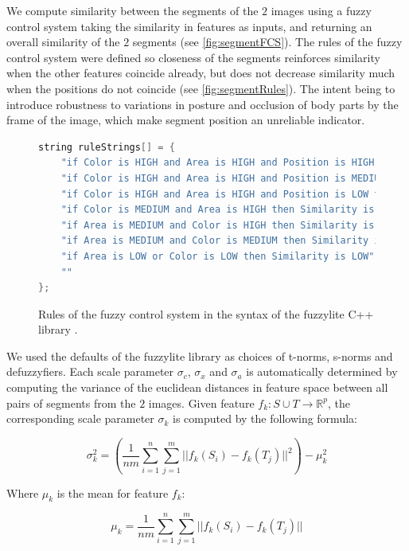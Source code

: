 We compute similarity between the segments of the $2$ images using a fuzzy control system taking the similarity in features as inputs, and returning an overall similarity of the $2$ segments (see \autoref{fig:segmentFCS}). The rules of the fuzzy control system were defined so closeness of the segments reinforces similarity when the other features coincide already, but does not decrease similarity much when the positions do not coincide (see \autoref{fig:segmentRules}). The intent being to introduce robustness to variations in posture and occlusion of body parts by the frame of the image, which make segment position an unreliable indicator. 

\begin{figure}[htb!]
\centering
\begin{lstlisting}[language=C++,showstringspaces
=false,breaklines=true]
string ruleStrings[] = {
	"if Color is HIGH and Area is HIGH and Position is HIGH then Similarity is VERYHIGH",
	"if Color is HIGH and Area is HIGH and Position is MEDIUM then Similarity is HIGH",
	"if Color is HIGH and Area is HIGH and Position is LOW then Similarity is HIGH",
	"if Color is MEDIUM and Area is HIGH then Similarity is MEDIUM",
	"if Area is MEDIUM and Color is HIGH then Similarity is MEDIUM",
	"if Area is MEDIUM and Color is MEDIUM then Similarity is LOW",
	"if Area is LOW or Color is LOW then Similarity is LOW",
	""
};
\end{lstlisting}
\caption{Rules of the fuzzy control system in the syntax of the fuzzylite C++ library \cite{fl::fuzzylite}.}
\label{fig:segmentRules}
\end{figure}

We used the defaults of the fuzzylite library \cite{fl::fuzzylite} as choices of t-norms, s-norms and defuzzyfiers. Each scale parameter $\sigma_c$, $\sigma_x$ and $\sigma_a$ is automatically determined by computing the variance of the euclidean distances in feature space between all pairs of segments from the $2$ images. Given feature $f_k : S \cup T \rightarrow \mathbb{R}^p$, the corresponding scale parameter $\sigma_k$ is computed by the following formula:

\[
\sigma_k^2 = (\frac{1}{nm}\sum_{i = 1}^n\sum_{j = 1}^m ||f_k(S_i) - f_k(T_j)||^2) - \mu_k^2
\]

Where $\mu_k$ is the mean for feature $f_k$:

\[
\mu_k = \frac{1}{nm}\sum_{i = 1}^n \sum_{j = 1}^m ||f_k(S_i) - f_k(T_j)||
\]

